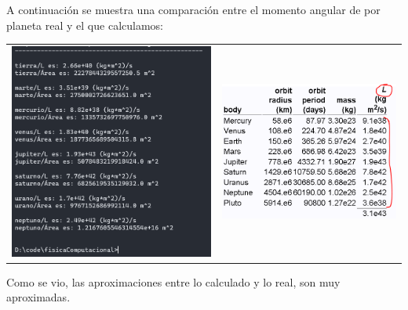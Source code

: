 \documentclass[a4paper,12pt]{article}
\begin{document}

    A continuación se muestra una comparación entre el momento angular
    de por planeta real y el que calculamos:
    \newpage
    \begin{table}[htbp]
        \centering
        \begin{tabular}{cc}
            \begin{minipage}{.3\textwidth}
                \includegraphics[width=\linewidth]{e3_4}
            \end{minipage}&\begin{minipage}{.3\textwidth}
                \includegraphics[width=\linewidth]{e3real}
            \end{minipage}
        \end{tabular}
    \end{table}
    Como se vio, las aproximaciones entre lo calculado y lo real, son muy aproximadas.
\end{document}
